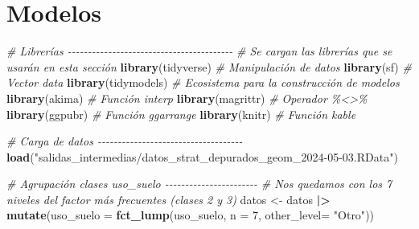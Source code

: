 \documentclass[12pt,a4paper,]{book}
\newenvironment{Shaded}{\begin{snugshade}}{\end{snugshade}}
\newcommand{\AttributeTok}[1]{\textcolor[rgb]{0.13,0.29,0.53}{#1}}
\newcommand{\CommentTok}[1]{\textcolor[rgb]{0.56,0.35,0.01}{\textit{#1}}}
\newcommand{\DecValTok}[1]{\textcolor[rgb]{0.00,0.00,0.81}{#1}}
\newcommand{\FunctionTok}[1]{\textcolor[rgb]{0.13,0.29,0.53}{\textbf{#1}}}
\newcommand{\NormalTok}[1]{#1}
\newcommand{\OtherTok}[1]{\textcolor[rgb]{0.56,0.35,0.01}{#1}}
\newcommand{\SpecialCharTok}[1]{\textcolor[rgb]{0.81,0.36,0.00}{\textbf{#1}}}
\newcommand{\StringTok}[1]{\textcolor[rgb]{0.31,0.60,0.02}{#1}}
\numberwithin{dummy}{section}
\theoremstyle{ocrenumbox}
\theoremstyle{blacknumex}
\theoremstyle{blacknumbox}
\theoremstyle{ocrenum}
\theoremstyle{ocrenum}
\begin{document}
\hypertarget{modelos}{%
\section{Modelos}\label{modelos}}

\begin{Shaded}
\begin{Highlighting}[]
\CommentTok{\# Librerías {-}{-}{-}{-}{-}{-}{-}{-}{-}{-}{-}{-}{-}{-}{-}{-}{-}{-}{-}{-}{-}{-}{-}{-}{-}{-}{-}{-}{-}{-}{-}{-}{-}{-}{-}{-}{-}{-}{-}{-}{-}}
\CommentTok{\# Se cargan las librerías que se usarán en esta sección}
\FunctionTok{library}\NormalTok{(tidyverse) }\CommentTok{\# Manipulación de datos }
\FunctionTok{library}\NormalTok{(sf) }\CommentTok{\# Vector data}
\FunctionTok{library}\NormalTok{(tidymodels) }\CommentTok{\# Ecosistema para la construcción de modelos}
\FunctionTok{library}\NormalTok{(akima) }\CommentTok{\# Función interp}
\FunctionTok{library}\NormalTok{(magrittr) }\CommentTok{\# Operador \%\textless{}\textgreater{}\% }
\FunctionTok{library}\NormalTok{(ggpubr) }\CommentTok{\# Función ggarrange}
\FunctionTok{library}\NormalTok{(knitr) }\CommentTok{\# Función kable}

\CommentTok{\# Carga de datos {-}{-}{-}{-}{-}{-}{-}{-}{-}{-}{-}{-}{-}{-}{-}{-}{-}{-}{-}{-}{-}{-}{-}{-}{-}{-}{-}{-}{-}{-}{-}{-}{-}{-}{-}{-} }
\FunctionTok{load}\NormalTok{(}\StringTok{"salidas\_intermedias/datos\_strat\_depurados\_geom\_2024{-}05{-}03.RData"}\NormalTok{)}

\CommentTok{\# Agrupación clases uso\_suelo {-}{-}{-}{-}{-}{-}{-}{-}{-}{-}{-}{-}{-}{-}{-}{-}{-}{-}{-}{-}{-}{-}{-}}
\CommentTok{\# Nos quedamos con los 7 niveles del factor más frecuentes (clases 2 y 3)}
\NormalTok{datos }\OtherTok{\textless{}{-}}\NormalTok{ datos }\SpecialCharTok{|\textgreater{}} 
  \FunctionTok{mutate}\NormalTok{(}\AttributeTok{uso\_suelo =} \FunctionTok{fct\_lump}\NormalTok{(uso\_suelo,}
                              \AttributeTok{n =} \DecValTok{7}\NormalTok{,}
                              \AttributeTok{other\_level=} \StringTok{"Otro"}\NormalTok{))}


\end{Highlighting}
\end{Shaded}
\end{document}
